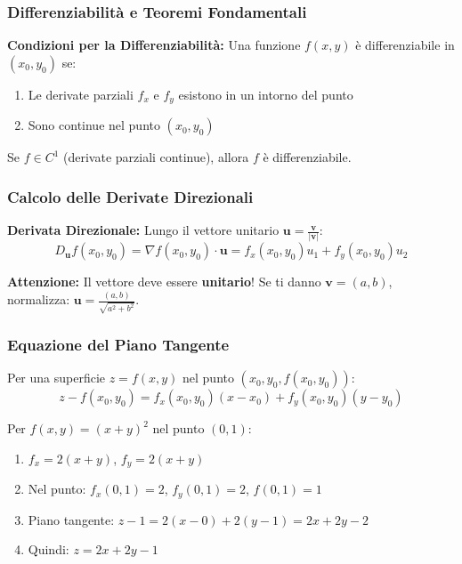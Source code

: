 \subsubsection{Differenziabilità e Teoremi Fondamentali}

\begin{info}
\textbf{Condizioni per la Differenziabilità:}
Una funzione $f(x,y)$ è differenziabile in $(x_0, y_0)$ se:
\begin{enumerate}
    \item Le derivate parziali $f_x$ e $f_y$ esistono in un intorno del punto
    \item Sono continue nel punto $(x_0, y_0)$
\end{enumerate}
Se $f \in C^1$ (derivate parziali continue), allora $f$ è differenziabile.
\end{info}

\subsubsection{Calcolo delle Derivate Direzionali}

\begin{strategia}
\textbf{Derivata Direzionale:} Lungo il vettore unitario $\mathbf{u} = \frac{\mathbf{v}}{|\mathbf{v}|}$:
\[ D_{\mathbf{u}}f(x_0,y_0) = \nabla f(x_0,y_0) \cdot \mathbf{u} = f_x(x_0,y_0) u_1 + f_y(x_0,y_0) u_2 \]

\textbf{Attenzione:} Il vettore deve essere \textbf{unitario}! Se ti danno $\mathbf{v} = (a,b)$, normalizza: $\mathbf{u} = \frac{(a,b)}{\sqrt{a^2+b^2}}$.
\end{strategia}

\subsubsection{Equazione del Piano Tangente}

Per una superficie $z = f(x,y)$ nel punto $(x_0, y_0, f(x_0,y_0))$:
\[ z - f(x_0,y_0) = f_x(x_0,y_0)(x-x_0) + f_y(x_0,y_0)(y-y_0) \]

\begin{esempio}
Per $f(x,y) = (x+y)^2$ nel punto $(0,1)$:
\begin{enumerate}
    \item $f_x = 2(x+y)$, $f_y = 2(x+y)$
    \item Nel punto: $f_x(0,1) = 2$, $f_y(0,1) = 2$, $f(0,1) = 1$
    \item Piano tangente: $z - 1 = 2(x-0) + 2(y-1) = 2x + 2y - 2$
    \item Quindi: $z = 2x + 2y - 1$
\end{enumerate}
\end{esempio}

